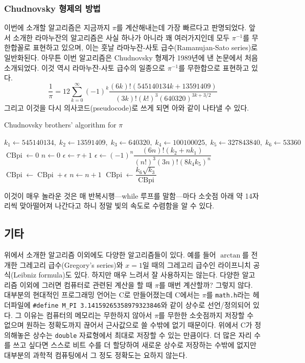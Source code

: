 \documentclass[10pt]{article}
\newcommand{\opn}{\operatorname}
\begin{document}
\subsubsection{Chudnovsky 형제의 방법}
이번에 소개할 알고리즘은 지금까지 $\pi$를 계산해내는데 가장 빠르다고 판명되었다. 앞서 소개한 라마누잔의 알고리즘은 사실 하나가 아니라 꽤 여러가지인데 모두 $\pi^{-1}$를 무한합꼴로 표현하고 있으며, 이는 훗날 라마누잔-사토 급수(Ramanujan-Sato series)로 일반화된다. 아무튼 이번 알고리즘은 Chudnovsky 형제가 1989년에 낸 논문\cite{chudnovsky}에서 처음 소개되었다. 이것 역시 라마누잔-사토 급수의 일종으로 $\pi^{-1}$를 무한합으로 표현하고 있다.
$$
  \dfrac{1}{\pi} = 12\sum_{k=0}^{\infty} \left(-1\right)^{k}\dfrac{\left(6k\right)!\left(545140134k + 13591409\right)}{\left(3k\right)!\left(k!\right)^{3}\left(640320\right)^{3k+3/2}}
$$
그리고 이것을 다시 의사코드(pseudocode)로 쓰게 되면 아와 같이 나타낼 수 있다.
\begin{algorithm}
  \caption{Chudnovsky brothers' algorithm for $\pi$}
  \begin{algorithmic}[1]
  \label{CBpi}
    \State $k_{1} \gets 545140134,\; k_{2} \gets 13591409,\; k_{3} \gets 640320, \; k_{4}\gets 100100025, \; k_{5} \gets 327843840, \; k_{6} \gets 53360 $
    \State $\opn{CBpi} \gets 0$
    \State $n \gets 0$
    \State $\epsilon \gets \tau + 1$
    \While{$\epsilon > \tau$}
      \State $\epsilon \gets \left(-1\right)^{n}\dfrac{\left(6n\right)!\left(k_{2}+nk_{1}\right)}{\left(n!\right)^{3}\left(3n\right)!\left(8k_{4}k_{5}\right)^{n}}$
      \State $\opn{CBpi} \gets \opn{CBpi} + \epsilon$
      \State $n \gets n + 1$
    \EndWhile
    \State $\opn{CBpi} \gets \dfrac{k_{6}\sqrt{k_{3}}}{\opn{CBpi}}$ 
  \EndProcedure
  \end{algorithmic}
\end{algorithm}
이것이 매우 놀라운 것은 매 반복시행---while 루프를 말함---마다 소숫점 아래 약 14자리씩 맞아떨어져 나간다고 하니 정말 빛의 속도로 수렴함을 알 수 있다. 

\pagebreak
\subsection{기타}
위에서 소개한 알고리즘 이외에도 다양한 알고리즘들이 있다. 예를 들어 $\arctan$를 전개한 그레고리 급수(Gregory's series)와 $x=1$일 때의 그레고리 급수인 라이프니치 공식(Leibniz formula)도 있다. 하지만 매우 느려서 잘 사용하지는 않는다. 다양한 알고리즘 이외에 그러면 컴퓨터로 관련된 계산을 할 때 $\pi$를 매번 계산할까? 그렇지 않다. 대부분의 현대적인 프로그래밍 언어는 C로 만들어졌는데 C에서는 $\pi$를 \texttt{math.h}라는 헤더파일에 \texttt{\#define M\_PI 3.14159265358979323846}와 같이 상수로 선언/정의되어 있다. 그 이유는 컴퓨터의 메모리는 무한하지 않아서 $\pi$를 무한한 소숫점까지 저장할 수 없으며 원하는 정확도까지 끊어서 근사값으로 쓸 수밖에 없기 때문이다. 위에서 C가 정의해놓은 상수는 \texttt{double} 자료형에서 최대로 저장할 수 있는 만큼이다. 더 많은 자리 수를 쓰고 싶다면 스스로 비트 수를 더 할당하여 새로운 상수로 저장하는 수밖에 없지만 대부분의 과학적 컴퓨팅에서 그 정도 정확도는 요하지 않는다.
\end{document}
